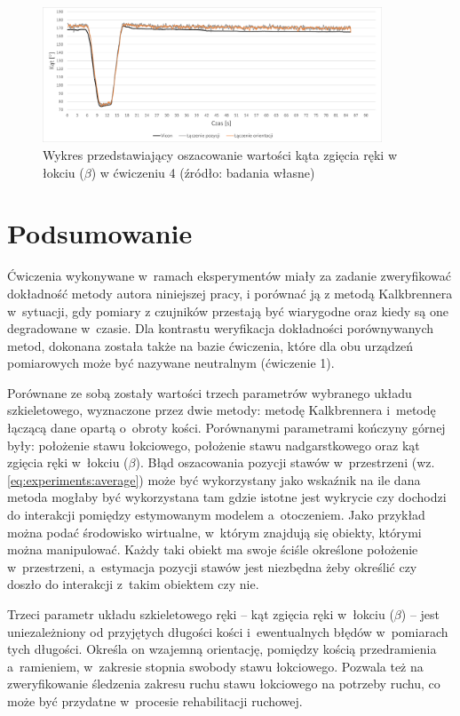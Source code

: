 \begin{figure}[!htb]
	\centering
	\includegraphics[width=0.9\textwidth]{images/400/angle.png}
	\caption{Wykres przedstawiający oszacowanie wartości kąta zgięcia ręki w łokciu ($\beta$) w ćwiczeniu 4 (źródło: badania własne)}
	\label{fig:experiments:fourth:angle}
\end{figure}
														
\section{Podsumowanie}																								
Ćwiczenia wykonywane w~ramach eksperymentów miały za zadanie zweryfikować dokładność metody autora niniejszej pracy, i porównać ją z metodą Kalkbrennera w~sytuacji, gdy pomiary z czujników przestają być wiarygodne oraz kiedy są one degradowane w~czasie. Dla kontrastu weryfikacja dokładności porównywanych metod, dokonana została także na bazie ćwiczenia, które dla obu urządzeń pomiarowych może być nazywane neutralnym (ćwiczenie 1).
																								
Porównane ze sobą zostały wartości trzech parametrów wybranego układu szkieletowego, wyznaczone przez dwie metody: metodę Kalkbrennera i~metodę łączącą dane opartą o~obroty kości. Porównanymi parametrami kończyny górnej były: położenie stawu łokciowego, położenie stawu nadgarstkowego oraz kąt zgięcia ręki w~łokciu ($\beta$). Błąd oszacowania pozycji stawów w~przestrzeni (wz. \ref{eq:experiments:average}) może być wykorzystany jako wskaźnik na ile dana metoda mogłaby być wykorzystana tam gdzie istotne jest wykrycie czy dochodzi do interakcji pomiędzy estymowanym modelem a~otoczeniem. Jako przykład można podać środowisko wirtualne, w~którym znajdują się obiekty, którymi można manipulować. Każdy taki obiekt ma swoje ściśle określone położenie w~przestrzeni, a~estymacja pozycji stawów jest niezbędna żeby określić czy doszło do interakcji z~takim obiektem czy nie.
																								 
Trzeci parametr układu szkieletowego ręki -- kąt zgięcia ręki w~łokciu ($\beta$) -- jest uniezależniony od przyjętych długości kości i~ewentualnych błędów w~pomiarach tych długości. Określa on wzajemną orientację, pomiędzy kością przedramienia a~ramieniem, w~zakresie stopnia swobody stawu łokciowego. Pozwala też na zweryfikowanie śledzenia zakresu ruchu stawu łokciowego na potrzeby ruchu, co może być przydatne w~procesie rehabilitacji ruchowej. 

